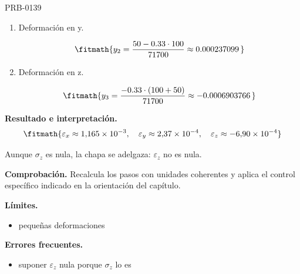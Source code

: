 \begin{studiumworked}{PRB-0139}
\begin{enumerate}
\[\fitmath{y_{1}=\frac{100-0.33\cdot 50}{71700}\approx 0.001164575\,}\]

\item Deformación en y.

\[\fitmath{y_{2}=\frac{50-0.33\cdot 100}{71700}\approx 0.000237099\,}\]

\item Deformación en z.

\[\fitmath{y_{3}=\frac{-0.33\cdot \left(100+50\right)}{71700}\approx -0.0006903766\,}\]

\end{enumerate}

\textbf{Resultado e interpretación.}\[\fitmath{\varepsilon_x \approx 1{,}165\times 10^{-3},\quad \varepsilon_y \approx 2{,}37\times 10^{-4},\quad \varepsilon_z \approx -6{,}90\times 10^{-4}}\]

Aunque $\sigma_z$ es nula, la chapa se adelgaza: $\varepsilon_z$ no es nula.

\par\textbf{Comprobación.} Recalcula los pasos con unidades coherentes y aplica el control específico indicado en la orientación del capítulo.

\textbf{Límites.}\begin{itemize}\item pequeñas deformaciones\end{itemize}

\textbf{Errores frecuentes.}\begin{itemize}\item suponer $\varepsilon_z$ nula porque $\sigma_z$ lo es\end{itemize}

\end{studiumworked}

\Needspace{.3\textheight}


